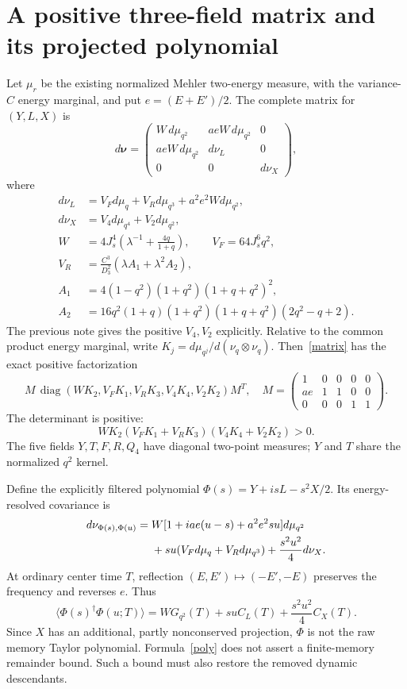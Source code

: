 \documentclass[11pt,a4paper]{article}
\newcommand{\J}{J_s}
\begin{document}
\section{A positive three-field matrix and its projected polynomial}
Let $\mu_r$ be the existing normalized Mehler two-energy measure,
with the variance-$C$ energy marginal, and put $e=(E+E')/2$.
The complete matrix for $(Y,L,X)$ is
\begin{equation}
 d\boldsymbol\nu=
 \begin{pmatrix}
 W\,d\mu_{q^2}&aeW\,d\mu_{q^2}&0\\
 aeW\,d\mu_{q^2}&d\nu_L&0\\
 0&0&d\nu_X
 \end{pmatrix}, \label{matrix}
\end{equation}
where
\begin{align}
 d\nu_L&=V_Fd\mu_q+V_Rd\mu_{q^3}+a^2e^2W d\mu_{q^2},\\
 d\nu_X&=V_4d\mu_{q^4}+V_2d\mu_{q^2},\\
 W&=4\J^4\left(\lambda^{-1}+\frac{4q}{1+q}\right),\qquad
 V_F=64\J^6q^2,\\
 V_R&=\frac{C^3}{D_3^2}(\lambda A_1+\lambda^2 A_2),\\
 A_1&=4(1-q^2)(1+q^2)(1+q+q^2)^2,\\
 A_2&=16q^2(1+q)(1+q^2)(1+q+q^2)(2q^2-q+2).
\end{align}
The previous note gives the positive $V_4,V_2$ explicitly.
Relative to the common product energy marginal, write
$K_j=d\mu_{q^j}/d(\nu_q\otimes\nu_q)$. Then~\eqref{matrix}
has the exact positive factorization
\begin{equation}
 M\,\operatorname{diag}(WK_2,V_FK_1,V_RK_3,V_4K_4,V_2K_2)M^T,
 \quad
 M=\begin{pmatrix}1&0&0&0&0\\ae&1&1&0&0\\0&0&0&1&1\end{pmatrix}.
\end{equation}
The determinant is positive:
\[
 WK_2(V_FK_1+V_RK_3)(V_4K_4+V_2K_2)>0.
\]
The five fields $Y,T,F,R,Q_4$ have diagonal
two-point measures; $Y$ and $T$ share the normalized $q^2$ kernel.

Define the explicitly filtered polynomial
$\Phi(s)=Y+isL-s^2X/2$. Its energy-resolved covariance is
\begin{align}
 d\nu_{\Phi(s),\Phi(u)}={}&
 W[1+iae(u-s)+a^2e^2su]d\mu_{q^2}\notag\\
 &+su(V_Fd\mu_q+V_Rd\mu_{q^3})
 +\frac{s^2u^2}{4}d\nu_X. \label{poly}
\end{align}
At ordinary center time $T$, reflection $(E,E')\mapsto(-E',-E)$
preserves the frequency and reverses $e$. Thus
\begin{equation}
 \langle\Phi(s)^\dagger\Phi(u;T)\rangle
 =WG_{q^2}(T)+suC_L(T)+\frac{s^2u^2}{4}C_X(T).
\end{equation}
Since $X$ has an additional, partly nonconserved projection,
$\Phi$ is not the raw memory Taylor polynomial. Formula~\eqref{poly}
does not assert a finite-memory remainder bound. Such a bound must
also restore the removed dynamic descendants.
\end{document}
